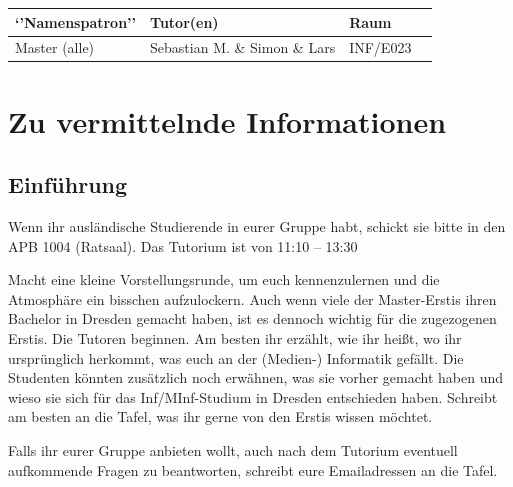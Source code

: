 \documentclass[a4paper,12pt]{report}
\begin{document}
\begin{center}
\vspace{1cm}
\begin{tabular}[h]{|l|l|l|l|}
	\hline
	\textbf{`'Namenspatron''} & \textbf{Tutor(en)} & \textbf{Raum}\\ \hline
	Master (alle) & Sebastian M. \&  Simon  \& Lars & INF/E023\\
	\hline
\end{tabular}
\end{center}

\chapter{Zu vermittelnde Informationen}

\section{Einführung}
\begin{itemize*}
\item Wenn ihr ausländische Studierende in eurer Gruppe habt, schickt sie bitte in den APB 1004 (Ratsaal). Das Tutorium ist von 11:10 – 13:30\\
\item Macht eine kleine Vorstellungsrunde, um euch kennenzulernen und die Atmosphäre ein bisschen aufzulockern. Auch wenn viele der Master-Erstis ihren Bachelor in Dresden gemacht haben, ist es dennoch wichtig für die zugezogenen Erstis.
Die Tutoren beginnen.
Am besten ihr erzählt, wie ihr heißt, wo ihr ursprünglich herkommt, was euch an der (Medien-) Informatik gefällt. 
Die Studenten könnten zusätzlich noch erwähnen, was sie vorher gemacht haben und wieso sie sich für das Inf/MInf-Studium in Dresden entschieden haben.
Schreibt am besten an die Tafel, was ihr gerne von den Erstis wissen möchtet.
\item Falls ihr eurer Gruppe anbieten wollt, auch nach dem Tutorium eventuell aufkommende Fragen zu beantworten, schreibt eure Emailadressen an die Tafel.
\end{itemize*}
\end{document}
